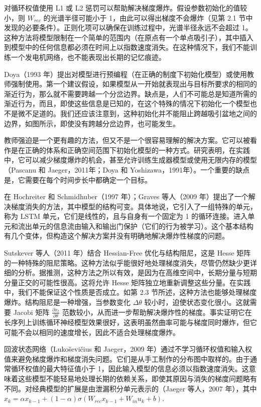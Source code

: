 对循环权值使用 L1 或 L2 惩罚可以帮助解决梯度爆炸。假设参数初始化的值较小，则 \(W_{rec}\) 的光谱半径可能小于 1，由此可以得出梯度不会爆炸（见第 2.1 节中发现的必要条件）。正则化项可以确保在训练过程中，光谱半径永远不会超过 1。这种方法将模型限制在一个简单的范围内（在原点有一个单点吸引子），其中插入到模型中的任何信息都必须在时间上以指数速度消失。在这种情况下，我们不能训练一个发电机网络，也不能表现出长期的记忆痕迹。

Doya（1993 年）提出对模型进行预编程（在正确的制度下初始化模型）或使用教师强制使用。第一个建议假设，如果模型从一开始就表现出与目标所要求的相同的渐近行为，那么就不需要跨越一个分岔边界。缺点是，人们不可能总是知道所需的渐近行为，而且，即使这些信息是已知的，在这个特殊的情况下初始化一个模型也不是微不足道的。我们还应该注意到，这种初始化并不能阻止跨越吸引盆地之间的边界，如图所示，即使没有跨越分岔边界，也可能发生。

教师强迫是一个更有趣的方法，但又不是一个很容易理解的解决方案。它可以被看作是在正确的体系和正确空间范围下初始化模型的一种方式。研究表明，在实践中，它可以减少梯度爆炸的机会，甚至允许训练生成器模型或使用无限内存的模型（Pascanu 和 Jaeger，2011年；Doya 和 Yoshizawa，1991年）。一个重要的缺点是，它需要在每个时间步长中都确定一个目标。

在 Hochreiter 和 Schmidhuber（1997 年）；Graves 等人（2009 年）提出了一个解决梯度消失的方法，其中模型的结构可变。具体地说，它引入了一组特殊的单元，称为 LSTM 单元，它们是线性的，且与自身有一个固定为 1 的循环连接。进入单元和流出单元的信息流由输入和输出门保护（它们的行为被学习）。这个基本结构有几个变体，但构造这个解决方案并没有明确地解决爆炸性梯度的问题。

Sutskever 等人（2011 年）结合 Hessian-Free 优化与结构阻尼，这是 Hesse 矩阵的一种特殊的阻尼策略。这种方法似乎能很好地处理梯度消失，尽管仍然缺少更详细的分析。据推测，这种方法之所以有效，是因为在高维空间中，长期分量与短期分量正交的可能性很高。这将允许 Hesse 矩阵独立地重新调整这些分量。在实践中，我们不能保证这个性质是否成立。如第 2.3 节所述，这种方法也能够处理梯度爆炸。结构阻尼是一种增强，当参数变化 \(\Delta \theta\) 较小时，迫使状态变化很小。这就需要 Jacobi 矩阵 \(\frac{\partial x_t}{\partial\theta}\) 范数较小，从而进一步帮助解决爆炸性的梯度。事实证明它在长序列上训练循环神经模型效果很好，这表明虽然曲率可能与梯度同时爆炸，但它可能不会以相同的速度增长，因此不适合处理梯度爆炸。

回波状态网络（Lukoševičius 和 Jaeger，2009 年）通过不学习循环权值和输入权值来避免梯度爆炸和梯度消失问题。它们是从手工制作的分布图中取样的。由于通常循环权值的最大特征值小于 1，因此输入模型的信息必须以指数速度消失。这意味着这些模型不能轻易地处理长期的依赖关系，即使其原因与消失的梯度问题略有不同。对经典模型的扩展是由泄漏积分单元表示的（Jaeger 等人，2007 年），其中 \(x_k = \alpha x_{k-1}+(1-\alpha)\sigma(W_{rec}x_{k-1}+W_{in}u_k+b)\).

